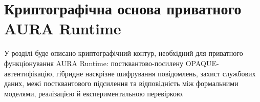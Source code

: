 \chapter{Криптографічна основа приватного AURA Runtime}

У розділі буде описано криптографічний контур, необхідний для приватного функціонування AURA Runtime: постквантово-посилену OPAQUE-автентифікацію, гібридне наскрізне шифрування повідомлень, захист службових даних, межі постквантового підсилення та відповідність між формальними моделями, реалізацією й експериментальною перевіркою.
